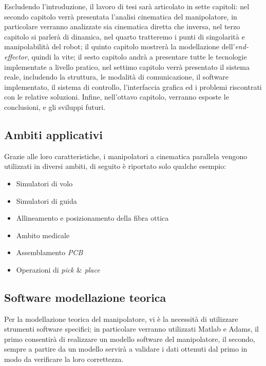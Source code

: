 Escludendo l'introduzione, il lavoro di tesi sarà articolato in sette capitoli: nel secondo capitolo verrà presentata l'analisi cinematica del manipolatore, in particolare verranno analizzate sia cinematica diretta che inversa, nel terzo capitolo si parlerà di dinamica, nel quarto tratteremo i punti di singolarità e manipolabilità del robot; il quinto capitolo mostrerà la modellazione dell'\textit{end-effector}, quindi la vite; il sesto capitolo andrà a presentare tutte le tecnologie implementate a livello pratico, nel settimo capitolo verrà presentato il sistema reale, includendo la struttura, le modalità di comunicazione, il software implementato, il sistema di controllo, l'interfaccia grafica ed i problemi riscontrati con le relative soluzioni. Infine, nell'ottavo capitolo, verranno esposte le conclusioni, e gli sviluppi futuri.
\subsection{Ambiti applicativi}
Grazie alle loro caratteristiche, i manipolatori a cinematica parallela vengono utilizzati in diversi ambiti, di seguito è riportato solo qualche esempio:
\begin{itemize}
	\item Simulatori di volo
	\item Simulatori di guida
	\item Allineamento e posizionamento della fibra ottica
	\item Ambito medicale
	\item Assemblamento \textit{PCB}
	\item Operazioni di \textit{pick $\&$ place}
\end{itemize}

\subsection{Software modellazione teorica}
Per la modellazione teorica del manipolatore, vi è la necessità di utilizzare strumenti software specifici; in particolare verranno utilizzati Matlab e Adams, il primo consentirà di realizzare un modello software del manipolatore, il secondo, sempre a partire da un modello servirà a validare i dati ottenuti dal primo in modo da verificare la loro correttezza.
